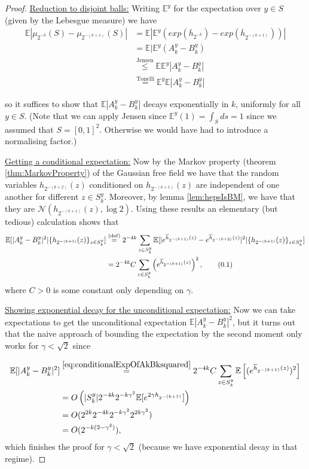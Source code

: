 \documentclass[11pt,reqno]{amsart}
\numberwithin{equation}{section}
\newcommand{\eqby}[1]{\mathrel{\stackrel{#1}{=}}}
\newcommand{\eqbydef}{\mathrel{\stackrel{\text{(def)}}{=}}}
\newcommand{\leqby}[1]{\mathrel{\stackrel{#1}{\leq}}}
\newcommand\numberthis{\addtocounter{equation}{1}\tag{\theequation}} %
\renewcommand\theequation{{\thesection}%
                   .{\arabic{equation}}}
\begin{document}
\begin{proof}
	\underline{Reduction to disjoint balls:} Writing $\mathbb E^y$ for the expectation over $y\in S$ (given by the Lebesgue measure) we have \begin{align*}
		\mathbb E|\mu_{2^{-k}}(S)-\mu_{2^{-(k+1)}}(S)| &= \mathbb E|\mathbb E^y(exp(\overline h_{2^{-k}})-exp(\overline h_{2^{-(k+1)}}))|\\
		&=\mathbb E|\mathbb E^y(A_k^y-B_k^y)\\
		&\leqby{\text{Jensen}}\mathbb E\mathbb E^y|A_k^y-B_k^y|\\
		&\eqby{\text{Tonelli}}\mathbb E^y\mathbb E|A_k^y-B_k^y|
	\end{align*}
	
	so it suffices to show that $\mathbb E|A_k^y-B_k^y|$ decays exponentially in $k$, uniformly for all $y\in S$. (Note that we can apply Jensen since $\mathbb E^y(1)=\int_S ds=1$ since we assumed that $S=[0,1]^2$. Otherwise we would have had to introduce a normalising factor.)
	
	\underline{Getting a conditional expectation:} Now by the Markov property (theorem \ref{thm:MarkovProperty}) of the Gaussian free field we have that the random variables $h_{2^{-(k+2)}}(z)$ conditioned on $h_{2^{-(k+1)}}(z)$ are independent of one another for different $z\in S_k^y$. Moreover, by lemma \ref{lem:hepsIsBM}, we have that they are $\mathcal N(h_{2^{-(k+1)}}(z),\log 2)$. Using these results an elementary (but tedious) calculation shows that
	\begin{align*}
		\mathbb E[|A_k^y-B_k^y|^2|\{h_{2^{-(k+1)}}(z)\}_{z\in S_k^y}] &\eqbydef 2^{-4k}\sum_{z\in S_k^y}\mathbb E[|e^{\overline h_{2^{-(k+1)}}(z)}-e^{\overline h_{2^{-(k+2)}}(z)}|^2|\{h_{2^{-(k+1)}}(z)\}_{z\in S_k^y}]\\
		&=2^{-4k}C\sum_{z\in S_k^y}\left(e^{\overline h_{2^{-(k+1)}}(z)}\right)^2,\numberthis \label{eq:conditionalExpOfAkBksquared}
	\end{align*}
	where $C>0$ is some constant only depending on $\gamma$.
	
	\underline{Showing exponential decay for the unconditional expectation:} Now we can take expectations to get the unconditional expectation $\mathbb E|A_k^y-B_k^y|^2$, but it turns out that the naive approach of bounding the expectation by the second moment only works for $\gamma<\sqrt 2$ since
	
	\begin{align*}
		\mathbb E[|A_k^y-B_k^y|^2] &\eqby{\eqref{eq:conditionalExpOfAkBksquared}}
		2^{-4k}C\sum_{z\in S_k^y}\mathbb E\left[(e^{\overline h_{2^{-(k+1)}}(z)})^2\right]\\
		&= O\left(|S_k^y|2^{-4k}2^{-k\gamma^2}\mathbb E[e^{2\gamma h_{2^{-(k+1)}}}]\right) \\
		&= O(2^{2k}2^{-4k}2^{-k\gamma^2}2^{2k\gamma^2})\\
		&= O(2^{-k(2-\gamma^2)}),
	\end{align*}
	which finishes the proof for $\gamma<\sqrt 2$ (because we have exponential decay in that regime).
	

\end{proof}
\end{document}
